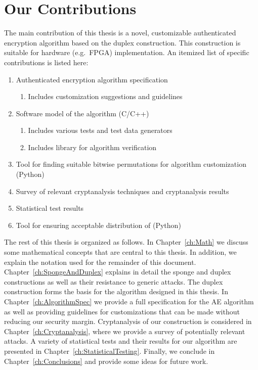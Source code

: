 \section{Our Contributions}
The main contribution of this thesis is a novel, customizable authenticated encryption algorithm based on the duplex construction.
This construction is suitable for hardware (e.g.\ FPGA) implementation.
An itemized list of specific contributions is listed here:
\begin{enumerate}
\item Authenticated encryption algorithm specification
  \begin{enumerate}
    \item Includes customization suggestions and guidelines
  \end{enumerate}
\item Software model of the algorithm (C/C++)
  \begin{enumerate}
    \item Includes various tests and test data generators
    \item Includes \gfsixteen library for algorithm verification
  \end{enumerate}
\item Tool for finding suitable bitwise permutations for algorithm customization (Python)
\item Survey of relevant cryptanalysis techniques and cryptanalysis results
\item Statistical test results 
\item Tool for ensuring acceptable distribution of \pvals (Python)
\end{enumerate}

The rest of this thesis is organized as follows.
In Chapter~\ref{ch:Math} we discuss some mathematical concepts that are central to this thesis.
In addition, we explain the notation used for the remainder of this document.
Chapter~\ref{ch:SpongeAndDuplex} explains in detail the sponge and duplex constructions as well as their resistance to generic attacks. 
The duplex construction forms the basis for the algorithm designed in this thesis.
In Chapter~\ref{ch:AlgorithmSpec} we provide a full specification for the AE algorithm as well as providing guidelines for customizations that can be made without reducing our security margin.
Cryptanalysis of our construction is considered in Chapter~\ref{ch:Cryptanalysis}, where we provide a survey of potentially relevant attacks.
A variety of statistical tests and their results for our algorithm are presented in Chapter~\ref{ch:StatisticalTesting}.
Finally, we conclude in Chapter~\ref{ch:Conclusions} and provide some ideas for future work.

